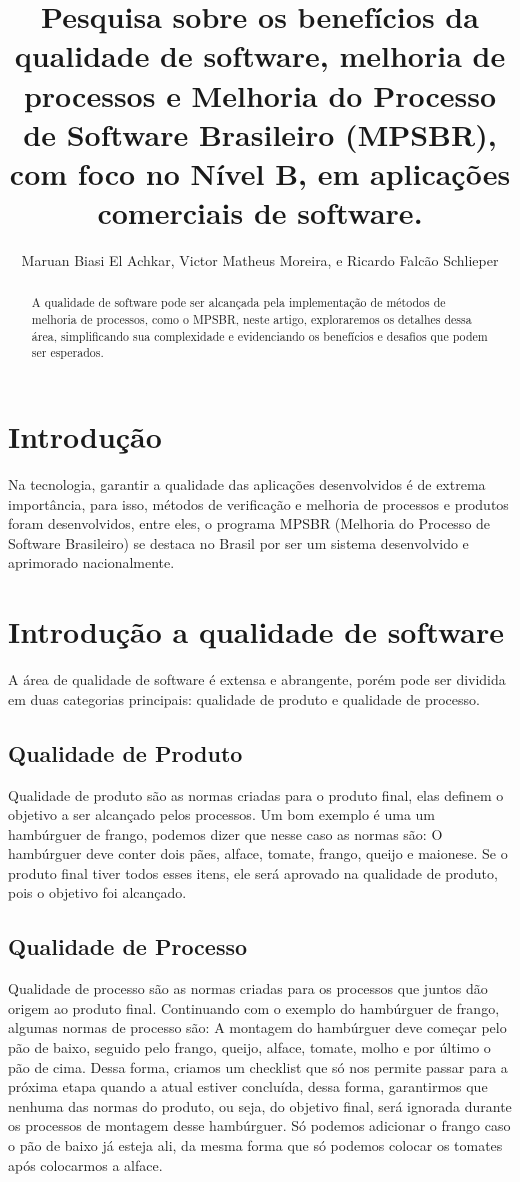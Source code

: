 \documentclass{article}
\title{Pesquisa sobre os benefícios da qualidade de software, melhoria de processos e Melhoria do Processo de Software Brasileiro (MPSBR), com foco no Nível B, em aplicações comerciais de software.}
\author{Maruan Biasi El Achkar, Victor Matheus Moreira, e Ricardo Falcão Schlieper}
\begin{document}
\maketitle

\begin{abstract}
A qualidade de software pode ser alcançada pela implementação de métodos de melhoria de processos, como o MPSBR, neste artigo, exploraremos os detalhes dessa área, simplificando sua complexidade e evidenciando os benefícios e desafios que podem ser esperados.
\end{abstract}

\section{Introdução}

Na tecnologia, garantir a qualidade das aplicações desenvolvidos é de extrema importância, para isso, métodos de verificação e melhoria de processos e produtos foram desenvolvidos, entre eles, o programa MPSBR (Melhoria do Processo de Software Brasileiro) se destaca no Brasil por ser um sistema desenvolvido e aprimorado nacionalmente.

\section{Introdução a qualidade de software}

A área de qualidade de software é extensa e abrangente, porém pode ser dividida em duas categorias principais: qualidade de produto e qualidade de processo.

\subsection{Qualidade de Produto}

 Qualidade de produto são as normas criadas para o produto final, elas definem o objetivo a ser alcançado pelos processos. Um bom exemplo é uma um hambúrguer de frango, podemos dizer que nesse caso as normas são: O hambúrguer deve conter dois pães, alface, tomate, frango, queijo e maionese. Se o produto final tiver todos esses itens, ele será aprovado na qualidade de produto, pois o objetivo foi alcançado.

\subsection{Qualidade de Processo}
Qualidade de processo são as normas criadas para os processos que juntos dão origem ao produto final. Continuando com o exemplo do hambúrguer de frango, algumas normas de processo são: A montagem do hambúrguer deve começar pelo pão de baixo, seguido pelo frango, queijo, alface, tomate, molho e por último o pão de cima. Dessa forma, criamos um checklist que só nos permite passar para a próxima etapa quando a atual estiver concluída, dessa forma, garantirmos que nenhuma das normas do produto, ou seja, do objetivo final, será ignorada durante os processos de montagem desse hambúrguer. Só podemos adicionar o frango caso o pão de baixo já esteja ali, da mesma forma que só podemos colocar os tomates após colocarmos a alface.
\end{document}
